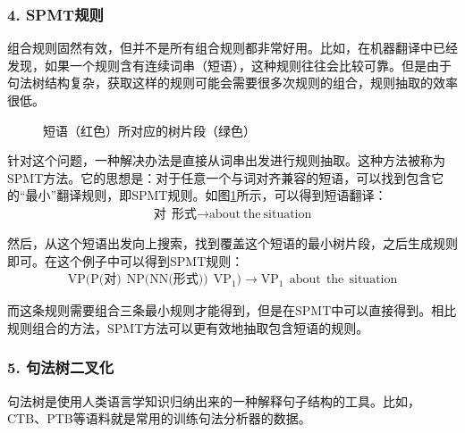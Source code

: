 \subsubsection{4. SPMT规则}

\parinterval 组合规则固然有效，但并不是所有组合规则都非常好用。比如，在机器翻译中已经发现，如果一个规则含有连续词串（短语），这种规则往往会比较可靠。但是由于句法树结构复杂，获取这样的规则可能会需要很多次规则的组合，规则抽取的效率很低。

\begin{figure}[htp]
\centering

\caption{短语（红色）所对应的树片段（绿色）}
\label{fig:8-30}
\end{figure}

\parinterval 针对这个问题，一种解决办法是直接从词串出发进行规则抽取。这种方法被称为SPMT方法。它的思想是：对于任意一个与词对齐兼容的短语，可以找到包含它的“最小”翻译规则，即SPMT规则。如图\ref{fig:8-30}所示，可以得到短语翻译：
\begin{eqnarray}
\textrm{对}\ \ \textrm{形式} \rightarrow \textrm{about}\ \textrm{the}\ \textrm{situation} \nonumber
\end{eqnarray}

\parinterval 然后，从这个短语出发向上搜索，找到覆盖这个短语的最小树片段，之后生成规则即可。在这个例子中可以得到SPMT规则：
\begin{eqnarray}
\textrm{VP(P(对)}\ \ \textrm{NP(NN(形式))}\ \ \textrm{VP}_1) \rightarrow \textrm{VP}_1\ \ \textrm{about}\ \ \textrm{the}\ \ \textrm{situation} \nonumber
\end{eqnarray}

\parinterval 而这条规则需要组合三条最小规则才能得到，但是在SPMT中可以直接得到。相比规则组合的方法，SPMT方法可以更有效地抽取包含短语的规则。


\subsubsection{5. 句法树二叉化}

\parinterval 句法树是使用人类语言学知识归纳出来的一种解释句子结构的工具。比如， CTB、PTB等语料就是常用的训练句法分析器的数据。


